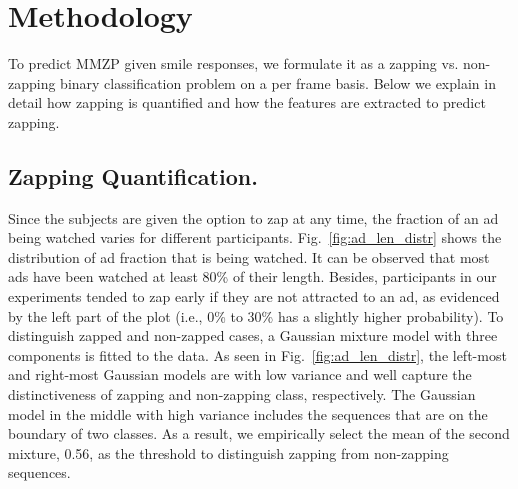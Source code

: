 \documentclass[twoside,leqno,twocolumn]{article}
\begin{document}
\section{Methodology}%
To predict MMZP given smile responses, we formulate it as a zapping vs. non-zapping binary classification problem on a per frame basis. Below we explain in detail how zapping is quantified and how the features are extracted to predict zapping.


\subsection{Zapping Quantification.}

Since the subjects are given the option to zap at any time, the fraction of an ad being watched varies for different participants. Fig.~\ref{fig:ad_len_distr} shows the distribution of ad fraction that is being watched. It can be observed that most ads have been watched at least 80\% of their length. Besides, participants in our experiments tended to zap early if they are not attracted to an ad, as evidenced by the left part of the plot (i.e., 0\% to 30\% has a slightly higher probability). To distinguish zapped and non-zapped cases, a Gaussian mixture model with three components is fitted to the data. As seen in Fig.~\ref{fig:ad_len_distr}, the left-most and right-most Gaussian models are with low variance and well capture the distinctiveness of zapping and non-zapping class, respectively. The Gaussian model in the middle with high variance includes the sequences that are on the boundary of two classes. As a result, we empirically select the mean of the second mixture, 0.56, as the threshold to distinguish zapping from non-zapping sequences.
\end{document}
